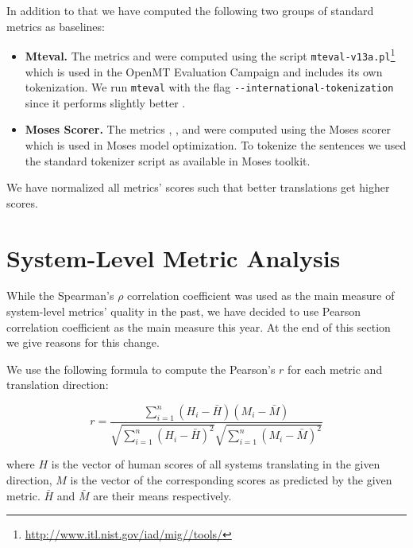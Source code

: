 In addition to that we have computed the following two groups of standard
metrics as baselines: 

\begin{itemize}

\item \textbf{Mteval.} The metrics   and
      were computed using the script
    \texttt{mteval-v13a.pl}\footnote{\url{http://www.itl.nist.gov/iad/mig//tools/}}
    which is used in the OpenMT Evaluation Campaign and includes its own
    tokenization.  We run \texttt{mteval} with the flag
    \texttt{-{}-international-tokenization} since it performs slightly better
    .

\item \textbf{Moses Scorer.} The metrics  ,
    ,  and  
    were computed using the Moses scorer which is used in Moses model
    optimization. To tokenize the sentences we used the standard tokenizer
    script as available in Moses toolkit.


\end{itemize}

We have normalized all metrics' scores such that better translations get higher scores. 


\section{System-Level Metric Analysis}
\label{system-level}


While the Spearman's $\rho$ correlation coefficient was used as the main
measure of system-level metrics' quality in the past, we have decided to use
Pearson correlation coefficient as the main measure this year. At the end of
this section we give reasons for this change. 

We use the following formula to compute the Pearson's $r$ for each metric and
translation direction:

\begin{equation}
    r = \frac{\sum ^n _{i=1}(H_i - \bar{H})(M_i - \bar{M})}{\sqrt{\sum ^n _{i=1}(H_i - \bar{H})^2} \sqrt{\sum ^n _{i=1}(M_i - \bar{M})^2}} 
\end{equation}

\noindent where $H$ is the vector of human scores of all systems translating in
the given
direction, $M$ is the vector of the corresponding scores as predicted by the
given metric. $\bar{H}$ and $\bar{M}$ are their means respectively.


